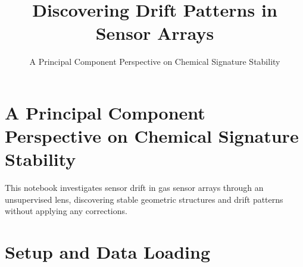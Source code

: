 \documentclass[
  letterpaper,
  DIV=11,
  numbers=noendperiod]{scrartcl}
\title{Discovering Drift Patterns in Sensor Arrays}
\subtitle{A Principal Component Perspective on Chemical Signature
Stability}
\author{}
\date{}
\renewcommand*\contentsname{Table of contents}
\newcommand\contentsname{Table of contents}
\begin{document}
\maketitle

\renewcommand*\contentsname{Table of contents}
{
\hypersetup{linkcolor=}
\setcounter{tocdepth}{3}
\tableofcontents
}

\section{A Principal Component Perspective on Chemical Signature
Stability}\label{a-principal-component-perspective-on-chemical-signature-stability}

This notebook investigates sensor drift in gas sensor arrays through an
unsupervised lens, discovering stable geometric structures and drift
patterns without applying any corrections.

\section{Setup and Data Loading}\label{setup-and-data-loading}
\end{document}
